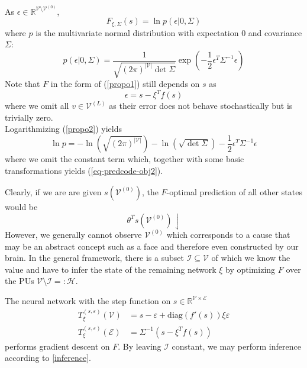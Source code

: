 \documentclass[a4paper,11pt]{article}
\begin{document}
\begin{Bew}
As $\epsilon\in\mathbb{R}^{\mathcal{V}\setminus\mathcal{V}^{(0)}}$, 
\begin{equation}\label{propo1}
F_{\xi,\Sigma}(s)=\ln p\left(\epsilon|0,\Sigma\right)
\end{equation}
where $p$ is the multivariate normal distribution with expectation $0$ and covariance $\Sigma$:
\begin{equation}\label{propo2}
p(\epsilon|0,\Sigma)=\frac{1}{\sqrt{(2\pi)^{|\mathcal{V}|}\det\Sigma}}\exp\left(-\frac12\epsilon^T\Sigma^{-1}\epsilon\right)
\end{equation}
Note that $F$ in the form of (\ref{propo1}) still depends on $s$ as 
\begin{equation}
\epsilon = s-\xi^Tf(s)
\end{equation}
where we omit all $v\in\mathcal{V}^{(L)}$ as their error does not behave stochastically but is trivially zero.\\
Logarithmizing (\ref{propo2}) yields
\begin{equation}
\ln p=-\ln\left(\sqrt{(2\pi)^{|\mathcal{V}|}}\right)-\ln\left(\sqrt{\det\Sigma}\right)-\frac12\epsilon^T\Sigma^{-1}\epsilon
\end{equation}
where we omit the constant term which, together with some basic transformations yields (\ref{eq-predcode-obj2}).
\end{Bew}
\begin{Abs}[Inference]\label{inference}
Clearly, if we are are given $s(\mathcal{V}^{(0)})$, the $F$-optimal prediction of all other states would be 
\begin{equation}
\theta^Ts(\mathcal{V}^{(0)})\downharpoonleft
\end{equation}
However, we generally cannot observe $\mathcal{V}^{(0)}$ which corresponds to a cause that may be an abstract concept such as a face and therefore even constructed by our brain. In the general framework, there is a subset $\mathcal{I}\subseteq\mathcal{V}$ of which we know the value and have to infer the state of the remaining network $\xi$ by optimizing $F$ over the PUs $\mathcal{V}\setminus\mathcal{I}=:\mathcal{H}$.
\end{Abs}
\begin{The}\label{the-pcm1}
The neural network with the step function on $s\in\mathbb{R}^{\mathcal{V}\times\mathcal{E}}$
\begin{align}
\label{pcm1-N}T^{(s,\varepsilon)}_{\xi}(\mathcal{V})&=s-\varepsilon+\text{diag}\left(f'(s)\right)\xi\varepsilon\\
\label{pcm1-eps}T^{(s,\varepsilon)}_{\xi}(\mathcal{E})&=\Sigma^{-1}\left(s-\xi^Tf(s)\right)\end{align}
performs gradient descent on $F$. By leaving $\mathcal{I}$ constant, we may perform inference according to \ref{inference}.
\end{The}
\end{document}
